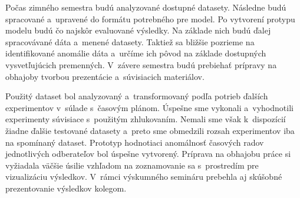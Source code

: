 \documentclass[a4paper,twoside,slovak,12pt,appendix]{article}
\begin{document}
\begin{appendices}
\noindent
Počas zimného semestra budú analyzované dostupné datasety. Následne budú
spracované a~upravené do formátu potrebného pre model. Po vytvorení protypu
modelu budú čo najskôr evaluované výsledky. Na základe nich budú ďalej
spracovávané dáta a~menené datasety. Taktiež sa bližšie pozrieme na
identifikované anomálie dáta a~určíme ich pôvod na základe dostupných
vysvetľujúcich premenných. V~závere semestra budú prebiehať prípravy na obhajoby
tvorbou prezentácie a~súvisiacich materiálov.

Použitý dataset bol analyzovaný a~transformovaný podľa potrieb ďalších
experimentov v~súlade s~časovým plánom. Úspešne sme vykonali a~vyhodnotili
experimenty súvisiace s~použitým zhlukovaním. Nemali sme však k~dispozícií
žiadne ďalšie testované datasety a~preto sme obmedzili rozsah experimentov
iba na spomínaný dataset. Prototyp hodnotiaci anomálnosť časových radov
jednotlivých odberateľov bol úspešne vytvorený. Príprava na obhajobu práce si
vyžiadala väčšie úsilie vzhľadom na zoznamovanie sa s~prostredím pre
vizualizáciu výsledkov. V~rámci výskumného semináru prebehla aj skúšobné
prezentovanie výsledkov kolegom.

\newpage

\end{appendices}
\end{document}
